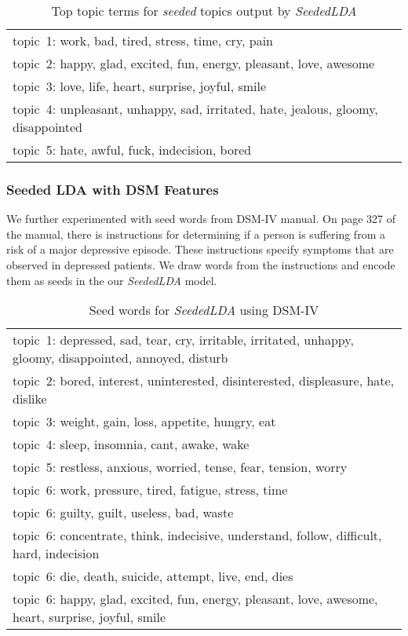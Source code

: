 \begin{table*} [ht!]
	\begin{tabular}{ l }
	\hline
{topic~1: work, bad, tired, stress, time, cry, pain}\\
{topic~2: happy, glad, excited, fun, energy, pleasant, love, awesome}\\
{topic~3: love, life, heart, surprise, joyful, smile}\\
{topic~4: unpleasant, unhappy, sad, irritated, hate, jealous, gloomy, disappointed }\\
{topic~5: hate, awful, fuck, indecision, bored}\\
\hline
    \end{tabular}
      \caption{\noindent Top topic terms for \textit{seeded} topics output by \textit{SeededLDA}}
        \label{table:seedwords_1}
\end{table*}

\subsubsection{Seeded LDA with DSM Features}

We further experimented with seed words from DSM-IV manual\cite{dsm4}. On page 327 of the manual, there is instructions for determining if a person is suffering from a risk of a major depressive episode. These instructions specify symptoms that are observed in depressed patients. We draw words from the instructions and encode them as seeds in the our \textit{SeededLDA} model.

\begin{table*} [ht!]
	\begin{tabular}{ l }
	\hline
{topic~1: depressed, sad, tear, cry, irritable, irritated, unhappy, gloomy, disappointed, annoyed, disturb}\\
{topic~2: bored, interest, uninterested, disinterested, displeasure, hate, dislike}\\
{topic~3: weight, gain, loss, appetite, hungry, eat}\\
{topic~4: sleep, insomnia, cant, awake, wake }\\
{topic~5: restless, anxious, worried, tense, fear, tension, worry}\\
{topic~6: work, pressure, tired, fatigue, stress, time}\\
{topic~6: guilty, guilt, useless, bad, waste}\\
{topic~6: concentrate, think, indecisive, understand, follow, difficult, hard, indecision}\\
{topic~6: die, death, suicide, attempt, live, end, dies}\\
{topic~6: happy, glad, excited, fun, energy, pleasant, love, awesome, heart, surprise, joyful, smile}\\
\hline
    \end{tabular}
      \caption{\noindent Seed words for \textit{SeededLDA} using DSM-IV}
        \label{table:seedwords_1}
\end{table*}

